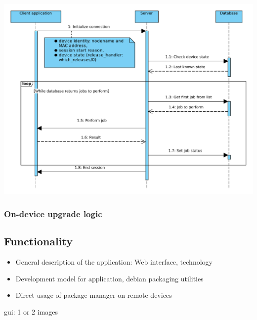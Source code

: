 \includegraphics[width=\textwidth]{graphics/session.pdf}

\subsubsection{On-device upgrade logic}

\subsection{Functionality}

\begin{itemize}
	\item General description of the application: Web interface, technology
    \item Development model for application, debian packaging utilities
    \item Direct usage of package manager on remote devices 
\end{itemize}

gui: 1 or 2 images 

